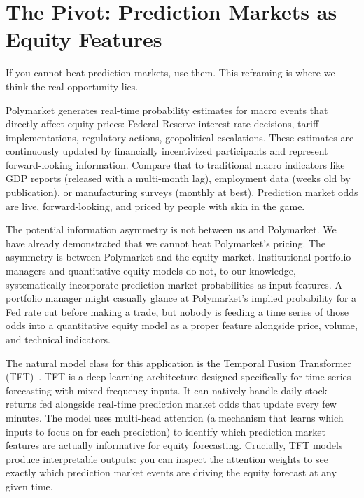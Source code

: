 \documentclass[conference]{IEEEtran}
\begin{document}
\section{The Pivot: Prediction Markets as Equity Features}

If you cannot beat prediction markets, use them. This reframing is where we think the real opportunity lies.

Polymarket generates real-time probability estimates for macro events that directly affect equity prices: Federal Reserve interest rate decisions, tariff implementations, regulatory actions, geopolitical escalations. These estimates are continuously updated by financially incentivized participants and represent forward-looking information. Compare that to traditional macro indicators like GDP reports (released with a multi-month lag), employment data (weeks old by publication), or manufacturing surveys (monthly at best). Prediction market odds are live, forward-looking, and priced by people with skin in the game.

The potential information asymmetry is not between us and Polymarket. We have already demonstrated that we cannot beat Polymarket's pricing. The asymmetry is between Polymarket and the equity market. Institutional portfolio managers and quantitative equity models do not, to our knowledge, systematically incorporate prediction market probabilities as input features. A portfolio manager might casually glance at Polymarket's implied probability for a Fed rate cut before making a trade, but nobody is feeding a time series of those odds into a quantitative equity model as a proper feature alongside price, volume, and technical indicators.

The natural model class for this application is the Temporal Fusion Transformer (TFT)~\cite{lim2021}. TFT is a deep learning architecture designed specifically for time series forecasting with mixed-frequency inputs. It can natively handle daily stock returns fed alongside real-time prediction market odds that update every few minutes. The model uses multi-head attention (a mechanism that learns which inputs to focus on for each prediction) to identify which prediction market features are actually informative for equity forecasting. Crucially, TFT models produce interpretable outputs: you can inspect the attention weights to see exactly which prediction market events are driving the equity forecast at any given time.
\end{document}

